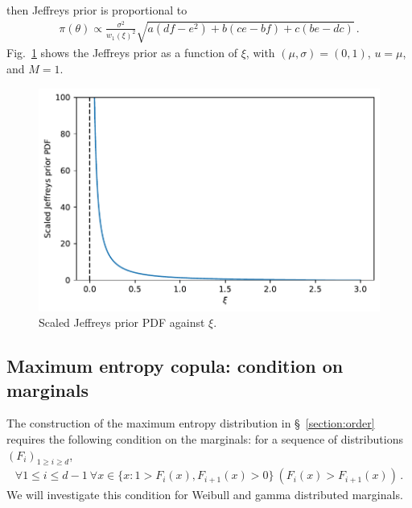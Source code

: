 \documentclass{article}
\begin{document}
%
then Jeffreys prior is proportional to
%
\begin{align*}
	\pi(\theta) \propto
		 \frac{\sigma^2}
		{w_1(\xi)^2}\sqrt{a(df-e^2) + b(ce-bf) + c(be-dc)} \,.
\end{align*}
%
Fig.~\ref{fig:jeffreys} shows the Jeffreys prior as a function of $\xi$,
with $(\mu, \sigma) = (0,  1)$, $u = \mu$, and $M = 1$.
%
\begin{figure}
	\centering
	\includegraphics[width=0.7\linewidth]{plots/jeffreys.pdf}
	\caption{Scaled Jeffreys prior PDF against $\xi$.}
	\label{fig:jeffreys}
\end{figure}
%
\subsection{Maximum entropy copula: condition on marginals}
\label{appendix:C2}
%

%
The construction of the maximum entropy distribution in
\S~\ref{section:order} requires the following condition on the marginals:
for a sequence of distributions $(F_i)_{1 \geq i \geq d}$,
%
\begin{align}
	\forall 1 \leq i \leq d - 1
		\ \forall x \in \{x \colon 1 > F_i(x), F_{i + 1}(x) > 0\}
		\ (F_i(x) > F_{i + 1}(x))\,.
	\label{eq:C2-2}
\end{align}
%
We will investigate this condition for
Weibull and gamma distributed marginals.
%
\end{document}

